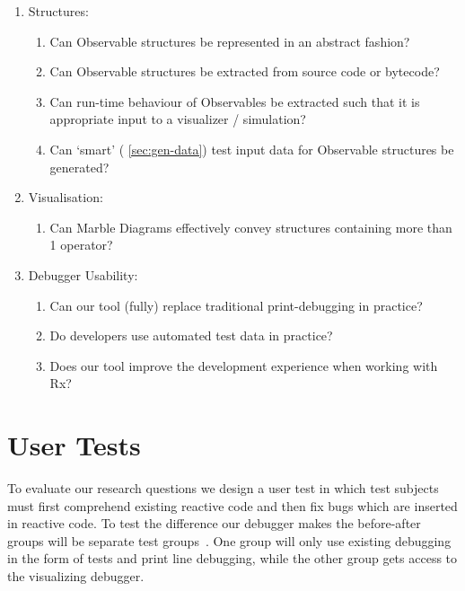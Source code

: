 \begin{enumerate}
    \item
        Structures:
        \begin{enumerate}
            \item
                Can Observable structures be represented in an abstract
                fashion?
            \item
                Can Observable structures be extracted from source code
                or bytecode?
            \item
                Can run-time behaviour of Observables be extracted such
                that it is appropriate input to a visualizer /
                simulation?
            \item
                Can `smart' (%
                \ref{sec:gen-data}) test input data for Observable
                structures be generated?
        \end{enumerate}

    \item
        Visualisation:
        \begin{enumerate}
            \item
                \label{qstn:marble} Can Marble Diagrams effectively
                convey structures containing more than 1 operator?
        \end{enumerate}

    \item
        Debugger Usability:
        \begin{enumerate}
            \item
                \label{qstn:println} Can our tool (fully) replace
                traditional print-debugging in practice?
            \item
                \label{qstn:autogen} Do developers use automated test
                data in practice?
            \item
                \label{qstn:experience} Does our tool improve the
                development experience when working with Rx?
        \end{enumerate}

\end{enumerate}

\section{User Tests}%
To evaluate our research questions we design a user test in which test
subjects must first comprehend existing reactive code and then fix bugs
which are inserted in reactive code.  To test the difference our
debugger makes the before-after groups will be separate test groups~\cite
{salvaneschi2014empirical}.  One group will only use existing debugging
in the form of tests and print line debugging, while the other group
gets access to the visualizing debugger.

